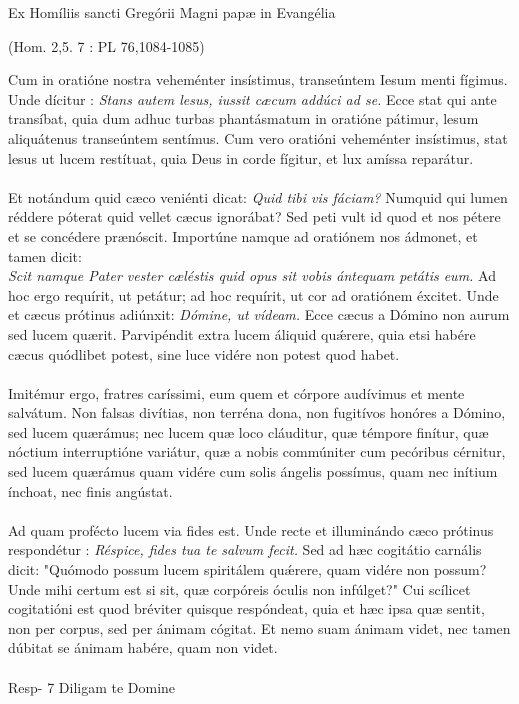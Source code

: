 \documentclass[options]{article}
\begin{document}
	Ex Homíliis sancti Gregórii Magni papæ in Evangélia 
	\begin{flushright}
	(Hom. 2,5. 7 : PL 76,1084-1085)
	\end{flushright}
Cum in oratióne nostra veheménter insístimus, transeúntem Iesum menti fígimus. Unde dícitur : 
\emph{Stans autem lesus, iussit cæcum addúci ad se.}
Ecce stat qui ante transíbat, quia dum adhuc turbas phantásmatum in oratióne pátimur, lesum aliquátenus transeúntem sentímus. Cum vero oratióni veheménter insístimus, stat lesus ut lucem restítuat, quia Deus in corde fígitur, et lux amíssa reparátur.\\
\\
Et notándum quid cæco veniénti dicat:
\emph{Quid tibi vis fáciam?}
 Numquid qui lumen réddere póterat quid vellet cæcus ignorábat? Sed peti vult id quod et nos pétere et se concédere prænóscit. Importúne namque ad oratiónem nos ádmonet, et tamen dicit:\\
 \emph{Scit namque Pater vester cæléstis quid opus sit vobis ántequam petátis eum.}
 Ad hoc ergo requírit, ut petátur; ad hoc requírit, ut cor ad oratiónem éxcitet. Unde et cæcus prótinus adiúnxit:
  \emph{Dómine, ut vídeam.}
  Ecce cæcus a Dómino non aurum sed lucem quærit. Parvipéndit extra lucem áliquid qu\'{æ}rere, quia etsi habére cæcus quódlibet potest, sine luce vidére non potest quod habet.\\
  \\
  Imitémur ergo, fratres caríssimi, eum quem et córpore audívimus et mente salvátum. Non falsas divítias, non terréna dona, non fugitívos honóres a Dómino, sed lucem quærámus; nec lucem quæ loco cláuditur, quæ témpore finítur, quæ nóctium interruptióne variátur, quæ a nobis commúniter cum pecóribus cérnitur, sed lucem quærámus quam vidére cum solis ángelis possímus, quam nec inítium ínchoat, nec finis angústat.\\
  \\
  Ad quam profécto lucem via fides est. Unde recte et illuminándo cæco prótinus respondétur : 
  \emph{Réspice, fides tua te salvum fecit.}
  Sed ad hæc cogitátio carnális dicit: "Quómodo possum lucem spiritálem qu\'{æ}rere, quam vidére non possum? Unde mihi certum est si sit, quæ corpóreis óculis non infúlget?" Cui scílicet cogitatióni est quod bréviter quisque respóndeat, quia et hæc ipsa quæ sentit, non per corpus, sed per ánimam cógitat. Et nemo suam ánimam videt, nec tamen dúbitat se ánimam habére, quam non videt.\\
  \\
  Resp- 7 Diligam te Domine
  
\end{document}
